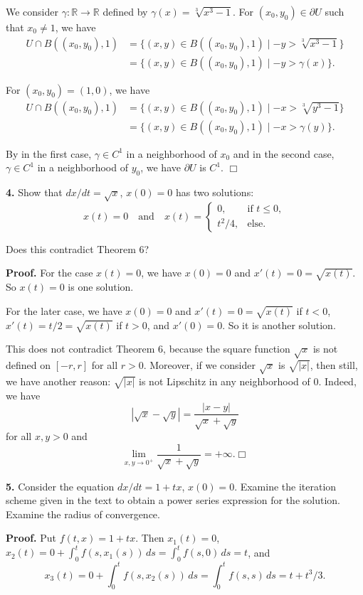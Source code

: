\documentclass{article}
\begin{document}
We consider $\gamma :\mathbb{R} \to \mathbb{R}$ defined by
$\gamma(x) = \sqrt[3]{x^3 -1}$. For $(x_0,y_0) \in \partial U$ such that
$x_0 \ne 1$, we have \[\begin{aligned}
U \cap B((x_0,y_0),1) &= \{ (x,y) \in B((x_0,y_0),1) \mid -y > \sqrt[3]{x^3 -1} \}\\
&= \{ (x,y) \in B((x_0,y_0),1) \mid -y > \gamma(x) \}.
\end{aligned}\]

For $(x_0,y_0) = (1,0)$, we have \[\begin{aligned}
U \cap B((x_0,y_0),1) &= \{ (x,y) \in B((x_0,y_0),1) \mid -x > \sqrt[3]{y^3 -1} \}\\
&= \{ (x,y) \in B((x_0,y_0),1) \mid -x>  \gamma(y) \}.
\end{aligned}\]

By in the first case, $\gamma \in C^1$ in a neighborhood of $x_0$ and in
the second case, $\gamma \in C^1$ in a neighborhood of $y_0$, we have
$\partial U$ is $C^1$. $\Box$

    \textbf{4.} Show that $dx/dt =\sqrt{x}$, $x(0) = 0$ has two solutions:
\[x(t) = 0 \quad\text{and}\quad x(t) = \begin{cases} 0, & \text{if } t\le 0,\\ t^2/4, &\text{else.}\end{cases}\]

Does this contradict Theorem 6?

    \textbf{Proof.} For the case $x(t) = 0$, we have $x(0) = 0$ and
$x'(t) = 0 = \sqrt{x(t)}$. So $x(t)  =0$ is one solution.

For the later case, we have $x(0) = 0$ and $x'(t) = 0 = \sqrt{x(t)}$ if
$t < 0$, $x'(t) =t/2 = \sqrt{x(t)}$ if $t > 0$, and $x'(0) = 0$. So it
is another solution.

This does not contradict Theorem 6, because the square function
$\sqrt{x}$ is not defined on $[-r, r]$ for all $r > 0$. Moreover, if we
consider $\sqrt{x}$ is $\sqrt{|x|}$, then still, we have another reason:
$\sqrt{|x|}$ is not Lipschitz in any neighborhood of $0$. Indeed, we
have \[|\sqrt{x} - \sqrt{y}| = \frac{|x-y|}{\sqrt{x} + \sqrt{y}}\] for
all $x,y > 0$ and
\[\lim_{x,y\to 0^+} \frac{1}{\sqrt{x} + \sqrt{y}} = +\infty. \Box\]

    \textbf{5.} Consider the equation $dx/dt = 1 + tx$, $x(0) = 0$. Examine
the iteration scheme given in the text to obtain a power series
expression for the solution. Examine the radius of convergence.

    \textbf{Proof.} Put $f(t,x) = 1 + tx$. Then $x_1(t) = 0$,
$x_2(t) = 0 + \int_0^t f(s,x_1(s))\,ds = \int_0^t f(s,0)\,ds = t$, and
\[x_3(t) = 0 + \int_0^tf(s,x_2(s))\,ds = \int_0^t f(s,s)\,ds = t + t^3/3.\]
\end{document}
